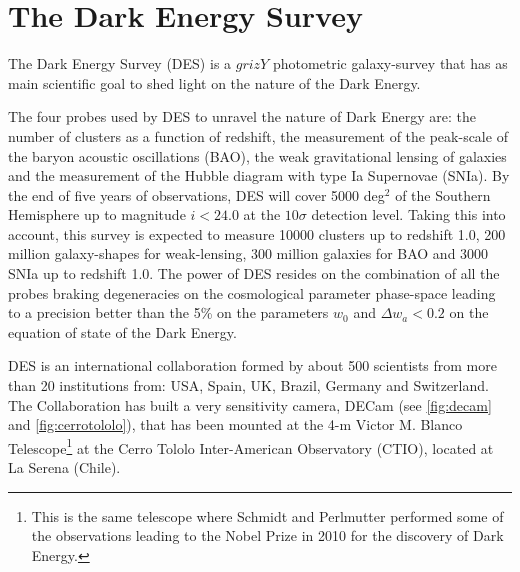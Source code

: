 \chapter{The Dark Energy Survey}
\label{ch:DES}

The Dark Energy Survey (DES) \cite{2005astro.ph.10346T} is a $grizY$ photometric galaxy-survey that has as main scientific goal to shed light on the nature of the Dark Energy.
\newline

The four probes used by DES to unravel the nature of Dark Energy are: the number of clusters as a function of redshift, the measurement of the peak-scale of the baryon acoustic oscillations (BAO), the weak gravitational lensing of galaxies and the measurement of the Hubble diagram with type Ia Supernovae (SNIa). By the end of five years of observations, DES will cover 5000 deg$^2$ of the Southern Hemisphere up to magnitude $i<24.0$ at the $10\sigma$ detection level. Taking this into account, this survey is expected to measure 10000 clusters up to redshift 1.0, 200 million galaxy-shapes for weak-lensing, 300 million galaxies for BAO and 3000 SNIa up to redshift 1.0. The power of DES resides on the combination of all the probes braking degeneracies on the cosmological parameter phase-space leading to a precision better than the 5\% on the parameters $w_0$ and $\Delta w_a<0.2$ on the equation of state of the Dark Energy.
\newline

DES is an international collaboration formed by about 500 scientists from more than 20 institutions from: USA, Spain, UK, Brazil, Germany and Switzerland. The Collaboration has built a very sensitivity camera, DECam (see \autoref{fig:decam} and \autoref{fig:cerrotololo}), that has been mounted at the 4-m Victor M. Blanco Telescope\footnote{This is the same telescope where Schmidt and Perlmutter performed some of the observations leading to the Nobel Prize in 2010 for the discovery of Dark Energy.} at the Cerro Tololo Inter-American Observatory (CTIO), located at La Serena (Chile).

